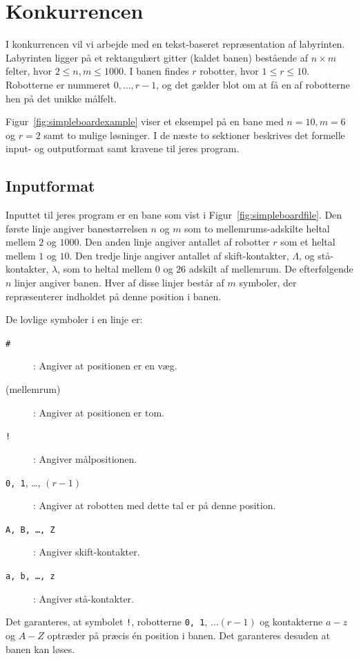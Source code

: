 \documentclass[10pt, a4paper]{article}
\begin{document}
\section{Konkurrencen}
I konkurrencen vil vi arbejde med en tekst-baseret repræsentation af labyrinten.
Labyrinten ligger på et rektangulært gitter (kaldet banen) bestående af $n \times m$ felter, hvor $2 \leq n,m \leq 1000$.
I banen findes $r$ robotter, hvor $1 \leq r \leq 10$. Robotterne er nummeret $0, \ldots, r-1$, og det gælder blot om at få en af robotterne hen på det unikke målfelt.

Figur~\ref{fig:simpleboardexample} viser et eksempel på en bane med $n=10, m=6$ og $r=2$ samt to mulige løsninger. I de næste to sektioner beskrives det formelle input- og outputformat samt kravene til jeres program.

\subsection{Inputformat}
Inputtet til jeres program er en bane som vist i Figur~\ref{fig:simpleboardfile}.
Den første linje angiver banestørrelsen $n$ og $m$ som to mellemrums-adskilte heltal mellem $2$ og $1000$.
Den anden linje angiver antallet af robotter $r$ som et heltal mellem $1$ og $10$.
Den tredje linje angiver antallet af skift-kontakter, $\Lambda$, og stå-kontakter, $\lambda$, som to heltal mellem $0$ og $26$ adskilt af mellemrum.
De efterfølgende $n$ linjer angiver banen.
Hver af disse linjer består af $m$ symboler, der repræsenterer indholdet på denne position i banen.

De lovlige symboler i en linje er:

\begin{description}
\item[\texttt{\#}]: Angiver at positionen er en væg.
\item[(mellemrum)]: Angiver at positionen er tom.
\item[\texttt{!}]: Angiver målpositionen.
\item[\texttt{0, 1}, \ldots, $(r-1)$]: Angiver at robotten med dette tal er på denne position.
\item[\texttt{A, B, \ldots, Z}]: Angiver skift-kontakter.
\item[\texttt{a, b, \ldots, z}]: Angiver stå-kontakter.
\end{description}

Det garanteres, at symbolet \texttt{!}, robotterne \texttt{0, 1}, $\ldots (r-1)$ og kontakterne $a-z$ og $A-Z$ optræder på præcis én position i banen.
Det garanteres desuden at banen kan løses.
\end{document}
